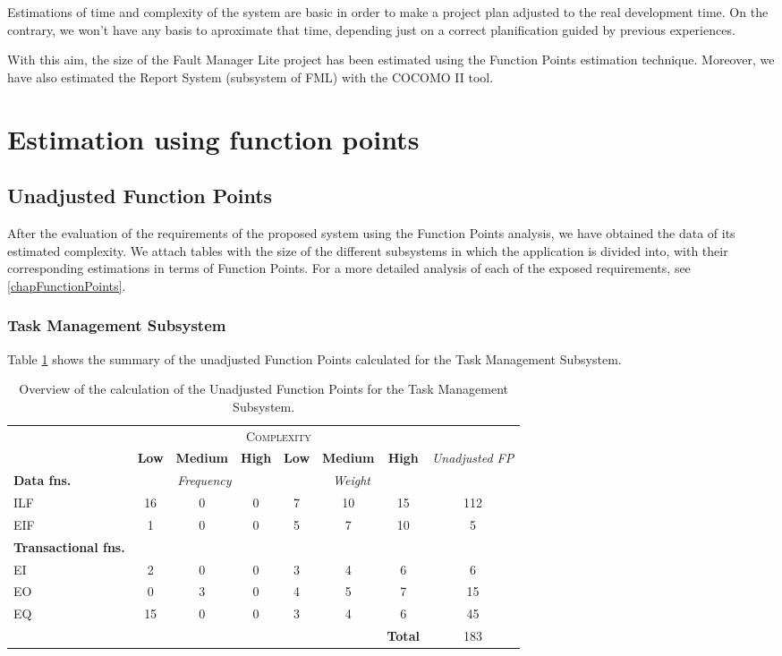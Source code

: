 Estimations of time and complexity of the system are basic in order to make a project plan adjusted to the real development time. On the contrary, we won't have any basis to aproximate that time, depending just on a correct planification guided by previous experiences.

With this aim, the size of the Fault Manager Lite project has been estimated using the Function Points estimation technique. Moreover, we have also estimated the Report System (subsystem of FML) with the COCOMO II tool.

\section{Estimation using function points}
\subsection{Unadjusted Function Points}
After the evaluation of the requirements of the proposed system using the Function Points analysis, we have obtained the data of its estimated complexity. We attach tables with the size of the different subsystems in which the application is divided into, with their corresponding estimations in terms of Function Points. For a more detailed analysis of each of the exposed requirements, see \ref{chapFunctionPoints}.


\subsubsection{Task Management Subsystem}
Table \ref{tbl_TMS_UFP} shows the summary of the unadjusted Function Points calculated for the Task Management Subsystem.
\begin{table}[hbtp]
\centering
\begin{tabular}{|l|c|c|c|c|c|c|c|}
\cline{2-7}
\multicolumn{1}{c}{} & \multicolumn{6}{|c|}{\textsc{Complexity}} & \multicolumn{1}{c}{}  \\ \cline{2-8}
\multicolumn{1}{c|}{} & \textbf{Low} & \textbf{Medium} & \textbf{High} & \textbf{Low} & \textbf{Medium} & \textbf{High} & \multirow{2}{*}{\textit{Unadjusted FP}} \\ \cline{1-7}
\textbf{Data fns.} & \multicolumn{3}{|c|}{\textit{Frequency}} &  \multicolumn{3}{|c|}{\textit{Weight}} & \\ \hline
ILF 	& 16 & 0 & 0 & 7 & 10 & 15 & 112 	\\ \hline
EIF 	& 1  & 0 & 0 & 5 & 7  & 10 & 5		\\ \hline
\textbf{Transactional fns.} & \multicolumn{7}{|c|}{} \\ \hline
EI 		& 2  & 0 & 0 & 3 & 4  & 6  & 6 		\\ \hline
EO 		& 0  & 3 & 0 & 4 & 5  & 7  & 15		\\ \hline
EQ		& 15 & 0 & 0 & 3 & 4  & 6  & 45		\\ \hline
\multicolumn{6}{c|}{} & \textbf{Total} & 183 \\ \cline{7-8}
\end{tabular}
\caption{Overview of the calculation of the Unadjusted Function Points for the Task Management Subsystem.}
\label{tbl_TMS_UFP}
\end{table}

